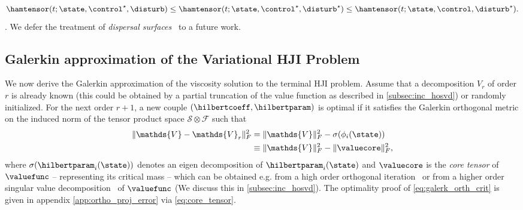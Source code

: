 %
\begin{align}
	\hamtensor(t; \state, \control^\star, \disturb) \le \hamtensor(t; \state, \control^\star, \disturb^\star) \le \hamtensor(t; \state, \control, \disturb^\star). 
	\label{eq:saddle_ham}
\end{align}
%
.
We defer the treatment of \textit{dispersal surfaces}~\cite{Isaacs1965} to a future work.

\subsection{Galerkin approximation of the Variational HJI Problem}
\label{subsec:galerkin}
%
We now derive the Galerkin approximation of the viscosity solution to the terminal HJI problem. Assume that a decomposition $V_{r}$ of order $r$ is already known (this could be obtained by a partial truncation of the value function as described in \autoref{subsec:inc_hosvd}) or randomly initialized. For the next order $r+1$, a new couple $\left(\hilbertcoeff, \hilbertparam\right)$ is optimal if it satisfies the Galerkin orthogonal metric on the induced norm of the tensor product space $\mathcal{S}\otimes \mathcal{F}$ such that 
%
\begin{align}
	\| \mathds{V} - \mathds{V}_{r} \|_F^2 &= \|\mathds{V} \|_F^2 - \sigma(\phi_i(\state)) \nonumber \\
	&\equiv \|\mathds{V} \|_F^2 - \| \valuecore \|_F^2,
	\label{eq:galerk_orth_crit}
\end{align}
%
where $\sigma(\hilbertparam_i(\state))$ denotes an eigen decomposition of $\hilbertparam_i(\state)$ and $\valuecore$ is the \textit{core tensor} of $\valuefunc$ -- representing its critical mass -- which can be obtained e.g. from a high order orthogonal iteration~\cite{Kolda2009} or from a higher order singular value decomposition~\cite{DeLathauwer2000, VannieuwenhovenTruncate2012} of $\valuefunc$ (We discuss this in \autoref{subsec:inc_hosvd}). The optimality proof of \eqref{eq:galerk_orth_crit} is given in appendix \ref{app:ortho_proj_error} via \eqref{eq:core_tensor}. 	


